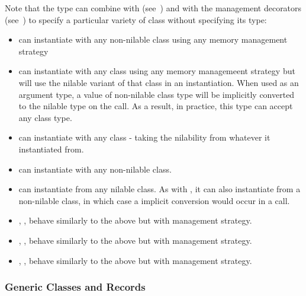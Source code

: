 Note that the  type can combine with 
(see~) and with the management decorators
(see~) to specify a particular variety of class without
specifying its type:

\begin{itemize}
\item
{} can instantiate with any non-nilable class using any
memory management strategy

\item
{} can instantiate with any class using any memory managemeent
strategy but will use the nilable variant of that class in an
instantiation. When used as an argument type, a value of non-nilable class
type will be implicitly converted to the nilable type on the call. As a
result, in practice, this type can accept any class type.

\item
{} can instantiate with any  class - taking the
nilability from whatever it instantiated from.

\item
{} can instantiate with any non-nilable  class.

\item
{} can instantiate from any nilable 
class. As with , it can also instantiate from a
non-nilable  class, in which case a implicit conversion
would occur in a call.

\item
{}, ,  behave similarly
to the above but with  management strategy.

\item
{}, ,  behave similarly
to the above but with  management strategy.

\item
{}, ,  behave similarly
to the above but with  management strategy.

\end{itemize}


\subsubsection{Generic Classes and Records}

